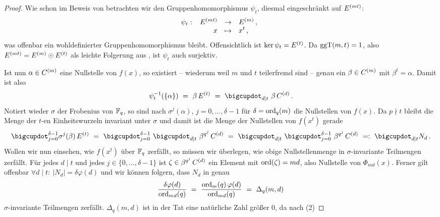 \begin{proof}
  Wie schon im Beweis von
   betrachten wir
  den Gruppenhomomorphismus $\psi_t$, diesmal eingeschränkt auf $E^{(mt)}$:
  \[ \psi_t:\ \funcdef{E\kl{mt} & \to& E\kl m\,,\\
    x &\mapsto& x^t\,,}\]
  was offenbar ein wohldefinierter Gruppenhomomorphismus bleibt.
  Offensichtlich ist $\ker\psi_t = E^{(t)}$. Da $\operatorname{ggT}(m,t) = 1$, also 
  $E^{(mt)} = E^{(m)} \odot E^{(t)}$ als leichte Folgerung aus
  , ist $\psi_t$ auch surjektiv.

  Ist nun $\alpha \in C^{(m)}$ eine Nullstelle von $f(x)$, 
  so existiert -- wiederum
  weil $m$ und $t$ teilerfremd sind -- genau ein $\beta \in C^{(m)}$ mit
  $\beta^t = \alpha$. Damit ist also
  \[ \psi_t\inv(\{\alpha\}) \speq= \beta\, E\kl t \speq=
    \bigcupdot_{d\mid t}\ \beta\, C\kl d \,.\]
  Notiert wieder $\sigma$ der Frobenius von
  $\mathbb{F}_q$, so sind nach 
  $\sigma^j(\alpha)$, $j=0,\ldots,\delta-1$ für 
  $\delta=\operatorname{ord}_q(m)$ die Nullstellen von $f(x)$. Da $p\nmid t$ bleibt
  die Menge der $t$-en Einheitswurzeln invariant unter $\sigma $ und 
  damit ist die Menge der Nullstellen von $f(x^t)$ gerade
  \begin{equation}
    \bigcupdot_{j=0}^{\delta-1} \sigma^j(\beta)\, E\kl t \speq=
    \bigcupdot_{j=0}^{\delta-1}\ \bigcupdot_{d\mid t}\ \beta^{q^j}\, C\kl d
    \speq=
    \bigcupdot_{d\mid t}\ \bigcupdot_{j=0}^{\delta-1}\ \beta^{q^j}\, C\kl d
    \speq{=:} \bigcupdot_{d\mid t} N_d\,. 
  \end{equation}
  Wollen wir nun einsehen, wie $f(x^t)$ über $\mathbb{F}_q$ zerfällt, so müssen wir
  überlegen, wie obige Nullstellenmenge in $\sigma$-invariante Teilmengen
  zerfällt. Für jedes $d\mid t$ und jedes $j\in\{0,\ldots,\delta -1\}$ ist
  $\zeta \in \beta^{q^j}\,C^{(d)}$ ein Element mit $\operatorname{ord}(\zeta) = md$, also
  Nullstelle von $\Phi_{md}(x)$. Ferner gilt
  offenbar $\forall d\mid t:\ |N_d| = \delta\varphi(d)$
  und wir können folgern, dass $N_d$ in genau
  \[ \frac{\delta\varphi(d)}{\operatorname{ord}_{md}(q)} \ =\  \frac{\operatorname{ord}_m(q)\,
    \varphi(d)}{\operatorname{ord}_{md}(q)} \ =\ 
    \Delta_q(m,d)\]
  $\sigma$-invariante Teilmengen zerfällt. $\Delta_q(m,d)$ ist in der Tat eine
  natürliche Zahl größer 0, da nach  (2)

\end{proof}
